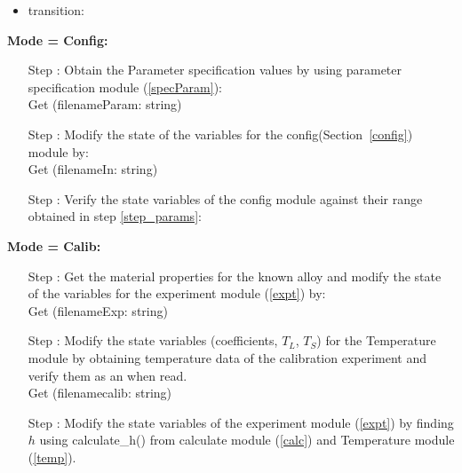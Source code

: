 \documentclass[12pt, titlepage]{article}
\newcounter{stepnum} %
\begin{document}
\begin{itemize}
\item transition: 
\end{itemize}

\textbf{Mode = Config:}
  
\begin{itemize}  
  
\item[Step \refstepcounter{stepnum}\thestepnum \label{step_params}:] Obtain the
  Parameter specification values by using parameter specification
  module (\ref{specParam}):\\

\noindent Get (filenameParam: string) \\

\item[Step \refstepcounter{stepnum}\thestepnum \label{step_config}:]Modify the
  state of the variables for the config(Section~\ref{config}) module by:\\

\noindent Get (filenameIn: string) \\

\item[Step \refstepcounter{stepnum}\thestepnum \label{step_configverify}:]Verify
  the state variables of the config module against their range obtained in step
  \ref {step_params}:\\

\end{itemize}
  
\textbf{Mode = Calib:}\\

\begin{itemize}

\item[Step \refstepcounter{stepnum}\thestepnum \label{step_matpropInput}:] Get
  the material properties for the known alloy and modify the state of the
  variables for the experiment module (\ref{expt}) by:\\

\noindent Get (filenameExp: string)  \\

\item[Step \refstepcounter{stepnum}\thestepnum \label{step_TempInCalib}:] Modify
  the state variables (coefficients, $T_L$, $T_S$) for the Temperature module by
  obtaining temperature data of the calibration experiment and verify them as an
  when read.\\

\noindent Get (filenamecalib: string)\\

\item[Step \refstepcounter{stepnum}\thestepnum \label{step_findh(t)}:] Modify
  the state variables of the experiment module (\ref{expt}) by finding $h$ using
  calculate\_h()  from calculate module (\ref{calc}) and Temperature
  module (\ref{temp}).
  
\end{itemize}  
  
\end{document}
